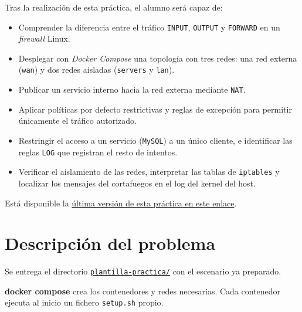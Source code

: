 \documentclass[a4paper]{article}
\begin{document}
Tras la realización de esta práctica, el alumno será capaz de:

\begin{itemize}
\item Comprender la diferencia entre el tráfico \texttt{INPUT}, \texttt{OUTPUT} y \texttt{FORWARD} en un \emph{firewall} Linux.
\item Desplegar con \emph{Docker Compose} una topología con tres redes: una red externa (\texttt{wan}) y dos redes aisladas (\texttt{servers} y \texttt{lan}).
\item Publicar un servicio interno hacia la red externa mediante \texttt{NAT}.
\item Aplicar políticas por defecto restrictivas y reglas de excepción para permitir únicamente el tráfico autorizado.
\item Restringir el acceso a un servicio (\texttt{MySQL}) a un único cliente, e identificar las reglas \texttt{LOG} que registran el resto de intentos.
\item Verificar el aislamiento de las redes, interpretar las tablas de \texttt{iptables} y localizar los mensajes del cortafuegos en el log del kernel del host.
\end{itemize}

Está disponible la \href{https://alvarogonzalezsotillo.github.io/apuntes-clase/seguridad-alta-disponibilidad/apuntes/4/sad-04-practica-iptables-docker.pdf}{última versión de esta práctica en este enlace}.
\section{Descripción del problema}
\label{sec:org0000003}

 \vspace{-2em}

Se entrega el directorio \href{https://alvarogonzalezsotillo.github.io/apuntes-clase/seguridad-alta-disponibilidad/apuntes/4/plantilla-practica.tar.gz }{\texttt{plantilla-practica/}} con el escenario ya preparado.

\textbf{docker compose} crea los contenedores y redes necesarias. Cada contenedor ejecuta al inicio un fichero \texttt{setup.sh} propio.
\end{document}
